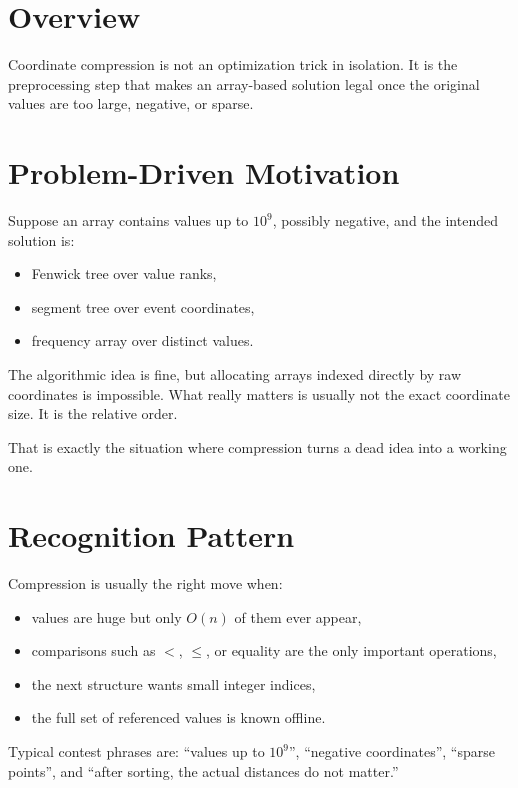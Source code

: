 \section*{Overview}

Coordinate compression is not an optimization trick in isolation. It is the preprocessing step that makes an
array-based solution legal once the original values are too large, negative, or sparse.

\section*{Problem-Driven Motivation}

Suppose an array contains values up to \(10^9\), possibly negative, and the intended solution is:

\begin{itemize}
  \item Fenwick tree over value ranks,
  \item segment tree over event coordinates,
  \item frequency array over distinct values.
\end{itemize}

The algorithmic idea is fine, but allocating arrays indexed directly by raw coordinates is impossible. What really
matters is usually not the exact coordinate size. It is the relative order.

That is exactly the situation where compression turns a dead idea into a working one.

\section*{Recognition Pattern}

Compression is usually the right move when:

\begin{itemize}
  \item values are huge but only \(O(n)\) of them ever appear,
  \item comparisons such as \(<\), \(\le\), or equality are the only important operations,
  \item the next structure wants small integer indices,
  \item the full set of referenced values is known offline.
\end{itemize}

Typical contest phrases are: ``values up to \(10^9\)'', ``negative coordinates'', ``sparse points'', and ``after sorting,
the actual distances do not matter.''

